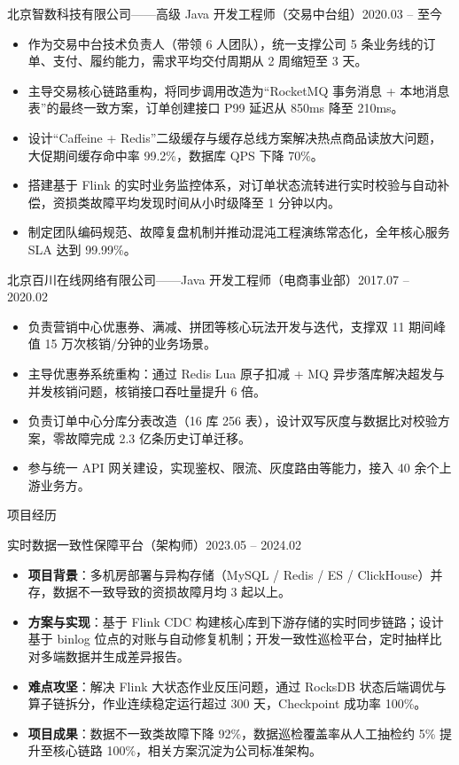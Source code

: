 \documentclass[10.5pt,fontset=windows]{ctexart}
\newcommand{\rsection}[1]{%
  \Needspace*{6\baselineskip}%
  \vspace{9pt}%
  {\color{maincolor}\heiti\zihao{4}#1}\par
  \vspace{1pt}{\color{maincolor}\rule{\textwidth}{1pt}}\par
  \vspace{3pt}}
\newcommand{\entryhead}[2]{%
  \Needspace*{3\baselineskip}%
  {\heiti #1}\hfill{\color{graytext}\small #2}\par\vspace{1pt}}
\begin{document}
\entryhead{北京智数科技有限公司\quad ——\quad 高级 Java 开发工程师（交易中台组）}{2020.03 -- 至今}
\begin{itemize}
  \item 作为交易中台技术负责人（带领 6 人团队），统一支撑公司 5 条业务线的订单、支付、履约能力，需求平均交付周期从 2 周缩短至 3 天。
  \item 主导交易核心链路重构，将同步调用改造为“RocketMQ 事务消息 + 本地消息表”的最终一致方案，订单创建接口 P99 延迟从 850ms 降至 210ms。
  \item 设计“Caffeine + Redis”二级缓存与缓存总线方案解决热点商品读放大问题，大促期间缓存命中率 99.2\%，数据库 QPS 下降 70\%。
  \item 搭建基于 Flink 的实时业务监控体系，对订单状态流转进行实时校验与自动补偿，资损类故障平均发现时间从小时级降至 1 分钟以内。
  \item 制定团队编码规范、故障复盘机制并推动混沌工程演练常态化，全年核心服务 SLA 达到 99.99\%。
\end{itemize}

\entryhead{北京百川在线网络有限公司\quad ——\quad Java 开发工程师（电商事业部）}{2017.07 -- 2020.02}
\begin{itemize}
  \item 负责营销中心优惠券、满减、拼团等核心玩法开发与迭代，支撑双 11 期间峰值 15 万次核销/分钟的业务场景。
  \item 主导优惠券系统重构：通过 Redis Lua 原子扣减 + MQ 异步落库解决超发与并发核销问题，核销接口吞吐量提升 6 倍。
  \item 负责订单中心分库分表改造（16 库 256 表），设计双写灰度与数据比对校验方案，零故障完成 2.3 亿条历史订单迁移。
  \item 参与统一 API 网关建设，实现鉴权、限流、灰度路由等能力，接入 40 余个上游业务方。
\end{itemize}

\rsection{项目经历}

\entryhead{实时数据一致性保障平台（架构师）}{2023.05 -- 2024.02}
\begin{itemize}
  \item \textbf{项目背景}：多机房部署与异构存储（MySQL / Redis / ES / ClickHouse）并存，数据不一致导致的资损故障月均 3 起以上。
  \item \textbf{方案与实现}：基于 Flink CDC 构建核心库到下游存储的实时同步链路；设计基于 binlog 位点的对账与自动修复机制；开发一致性巡检平台，定时抽样比对多端数据并生成差异报告。
  \item \textbf{难点攻坚}：解决 Flink 大状态作业反压问题，通过 RocksDB 状态后端调优与算子链拆分，作业连续稳定运行超过 300 天，Checkpoint 成功率 100\%。
  \item \textbf{项目成果}：数据不一致类故障下降 92\%，数据巡检覆盖率从人工抽检约 5\% 提升至核心链路 100\%，相关方案沉淀为公司标准架构。
\end{itemize}
\end{document}

